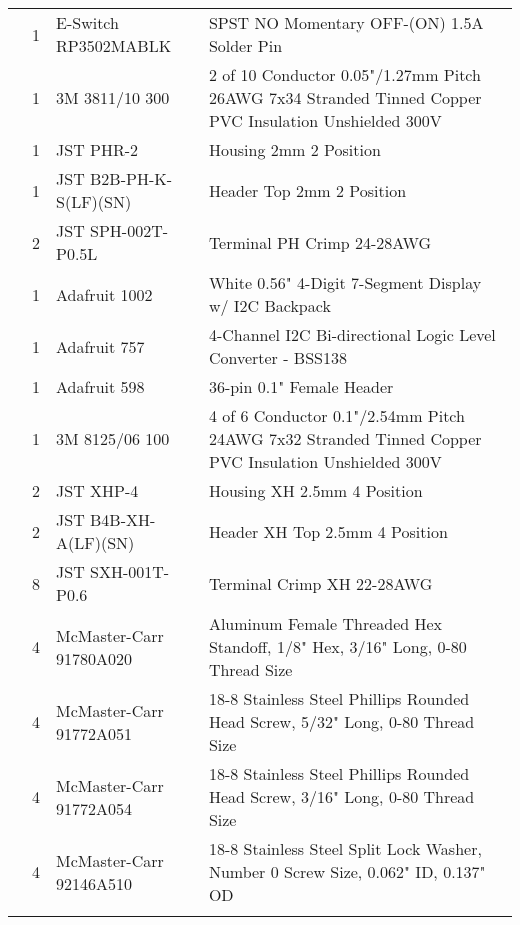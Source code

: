 \begin{longtabu}{X[3,c,m] X[1,c,m] X[3,c,m] X[5,l,m]}
   & 1 & E-Switch RP3502MABLK & SPST NO Momentary OFF-(ON) 1.5A Solder Pin \\
  & 1 & 3M 3811/10 300 & 2 of 10 Conductor 0.05"/1.27mm Pitch 26AWG 7x34 Stranded Tinned Copper PVC Insulation Unshielded 300V \\
  & 1 & JST PHR-2 & Housing 2mm 2 Position \\
  & 1 & JST B2B-PH-K-S(LF)(SN) & Header Top 2mm 2 Position \\
  & 2 & JST SPH-002T-P0.5L & Terminal PH Crimp 24-28AWG \\ \mrule

   & 1 & Adafruit 1002 & White 0.56" 4-Digit 7-Segment Display w/ I2C Backpack \\
  & 1 & Adafruit 757 & 4-Channel I2C Bi-directional Logic Level Converter - BSS138 \\
  & 1 & Adafruit 598 & 36-pin 0.1" Female Header \\
  & 1 & 3M 8125/06 100 & 4 of 6 Conductor 0.1"/2.54mm Pitch 24AWG 7x32 Stranded Tinned Copper PVC Insulation Unshielded 300V \\
  & 2 & JST XHP-4 & Housing XH 2.5mm 4 Position \\
  & 2 & JST B4B-XH-A(LF)(SN) & Header XH Top 2.5mm 4 Position \\
  & 8 & JST SXH-001T-P0.6 & Terminal Crimp XH 22-28AWG \\
  & 4 & McMaster-Carr 91780A020 & Aluminum Female Threaded Hex Standoff, 1/8" Hex, 3/16" Long, 0-80 Thread Size \\
  & 4 & McMaster-Carr 91772A051 & 18-8 Stainless Steel Phillips Rounded Head Screw, 5/32" Long, 0-80 Thread Size \\
  & 4 & McMaster-Carr 91772A054 & 18-8 Stainless Steel Phillips Rounded Head Screw, 3/16" Long, 0-80 Thread Size \\
  & 4 & McMaster-Carr 92146A510 & 18-8 Stainless Steel Split Lock Washer, Number 0 Screw Size, 0.062" ID, 0.137" OD \\ \mrule


\end{longtabu}
